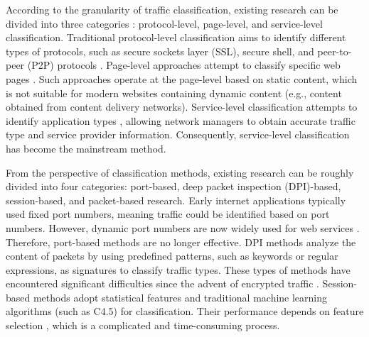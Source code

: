 \documentclass[preprint,12pt]{elsarticle}
\begin{document}
According to the granularity of traffic classification, existing research can be divided into three categories \cite{shbair2016multi}: protocol-level, page-level, and service-level classification. Traditional protocol-level classification aims to identify different types of protocols, such as secure sockets layer (SSL), secure shell, and peer-to-peer (P2P) protocols \cite{wang2014characterizing}. Page-level approaches attempt to classify specific web pages \cite{cheng1998traffic}. Such approaches operate at the page-level based on static content, which is not suitable for modern websites containing dynamic content (e.g., content obtained from content delivery networks). Service-level classification attempts to identify application types \cite{kim2015method}, allowing network managers to obtain accurate traffic type and service provider information. Consequently, service-level classification has become the mainstream method. 

From the perspective of classification methods, existing research can be roughly divided into four categories: port-based, deep packet inspection (DPI)-based, session-based, and packet-based research. Early internet applications typically used fixed port numbers, meaning traffic could be identified based on port numbers. However, dynamic port numbers are now widely used for web services \cite{alshammari2009machine}. Therefore, port-based methods are no longer effective.
DPI methods analyze the content of packets by using predefined patterns, such as keywords or regular expressions, as signatures to classify traffic types. These types of methods have encountered significant difficulties since the advent of encrypted traffic \cite{nguyen2008survey}. Session-based methods adopt statistical features and traditional machine learning algorithms (such as C4.5) for classification. Their performance depends on feature selection \cite{velan2015survey}, which is a complicated and time-consuming process. 
\end{document}
